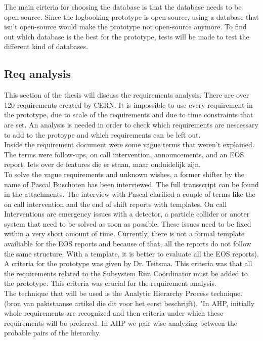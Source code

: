 \documentclass[paper=a4, fontsize=11pt,twoside]{scrartcl}	%
\begin{document}
The main cirteria for choosing the database is that the database needs to be open-source. Since the logbooking prototype is open-source, using a database that isn't open-source would make the prototype not open-source anymore. To find out which database is the best for the prototype, tests will be made to test the different kind of databases. \\

\newpage
\subsection{Req analysis}
This section of the thesis will discuss the requirements analysis. There are over 120 requirements created by CERN. It is impossible to use every requirement in the prototype, due to scale of the requirements and due to time constraints that are set. An analysis is needed in order to check which requirements are nescessary to add to the protoype and which requirements can be left out.  \\
Inside the requirement document were some vague terms that weren't explained. The terms were follow-ups, on call intervention, announcements, and an EOS report. Iets over de features die er staan, maar onduidelijk zijn. \\
To solve the vague requirements and unknown wishes, a former shifter by the name of Pascal Buschoten has been interviewed. The full transscript can be found in the attachments. The interview with Pascal clarified a couple of terms like the on call intervention and the end of shift reports with templates. On call Interventions are emergency issues with a detector, a particle collider or anoter system that need to be solved as soon as possible. These issues need to be fixed within a very short amount of time. Currently, there is not a formal template availiable for the EOS reports  and because of that, all the reports do not follow the same structure. With a template, it is better to evaluate all the EOS reports).\\
A criteria for the prototype was given by Dr. Teitsma. This criteria was that all the requirements related to the Subsystem Run Coördinator must be added to the prototype. This criteria was crucial for the requirement analysis. \\
The technique that will be used is the Analytic Hierarchy Process technique.(bron van pakistaanse artikel die dit voor het eerst beschrijft). "In AHP, initially whole requirements are recognized and then criteria under which these requirements will be preferred. In AHP we pair wise analyzing  between  the  probable  pairs  of  the  hierarchy. 
\end{document}
